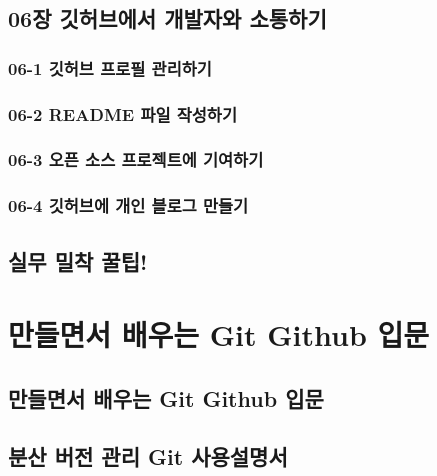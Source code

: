 \documentclass[12pt, a4paper, oneside]{book}
\let\stdsection\section
\renewcommand\section{\newpage\stdsection}
\begin{document}
		\section{	06장 깃허브에서 개발자와 소통하기	}		
		\subsection{	06-1 깃허브 프로필 관리하기	}		
		\subsection{	06-2 README 파일 작성하기	}		
		\subsection{	06-3 오픈 소스 프로젝트에 기여하기	}		
		\subsection{	06-4 깃허브에 개인 블로그 만들기	}		
						
		\section{	실무 밀착 꿀팁!	}		




%										
	\chapter 	{만들면서 배우는 Git Github 입문}

	\section 	{만들면서 배우는 Git Github 입문}




%										
	\section 	{분산 버전 관리 Git 사용설명서}
\end{document}
